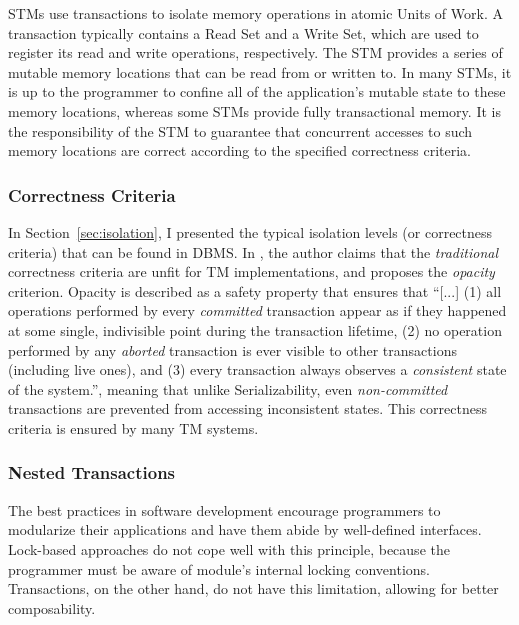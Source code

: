 \documentclass{llncs}
\begin{document}
STMs use transactions to isolate memory operations in atomic Units of
Work. A transaction typically contains a Read Set and a Write Set,
which are used to register its read and write operations,
respectively. The STM provides a series of mutable memory locations
that can be read from or written to. In many STMs, it is up to the
programmer to confine all of the application's mutable state to these
memory locations, whereas some STMs provide fully transactional
memory. It is the responsibility of the STM to guarantee that
concurrent accesses to such memory locations are correct according to
the specified correctness criteria.

\subsubsection{Correctness Criteria}
\label{sec:opacity}

In Section~\ref{sec:isolation}, I presented the typical isolation
levels (or correctness criteria) that can be found in DBMS. In
\cite{guerraoui2008correctness}, the author claims that the {\it
  traditional} correctness criteria are unfit for TM implementations,
and proposes the {\it opacity} criterion. Opacity is described as a
safety property that ensures that ``[...] (1) all operations performed
by every {\it committed} transaction appear as if they happened at
some single, indivisible point during the transaction lifetime, (2) no
operation performed by any {\it aborted} transaction is ever visible
to other transactions (including live ones), and (3) every transaction
always observes a {\it consistent} state of the system.'', meaning
that unlike Serializability, even {\it non-committed} transactions are
prevented from accessing inconsistent states. This correctness
criteria is ensured by many TM systems.

\subsubsection{Nested Transactions}

The best practices in software development encourage programmers to
modularize their applications and have them abide by well-defined
interfaces. Lock-based approaches do not cope well with this
principle, because the programmer must be aware of module's internal
locking conventions. Transactions, on the other hand, do not have this
limitation, allowing for better composability.
\end{document}

